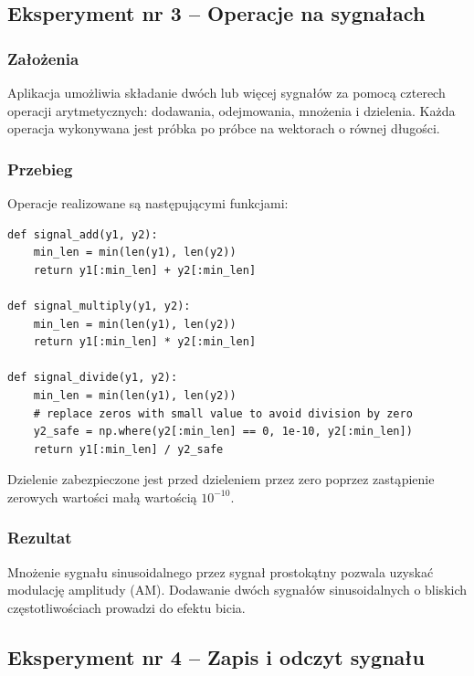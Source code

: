 \documentclass[12pt]{article}
\begin{document}
\newpage
\subsection{Eksperyment nr 3 -- Operacje na sygnałach}

\subsubsection{Założenia}

Aplikacja umożliwia składanie dwóch lub więcej sygnałów
za pomocą czterech operacji arytmetycznych: dodawania, odejmowania,
mnożenia i dzielenia. Każda operacja wykonywana jest próbka po próbce
na wektorach o równej długości.

\subsubsection{Przebieg}

Operacje realizowane są następującymi funkcjami:

\begin{lstlisting}
def signal_add(y1, y2):
    min_len = min(len(y1), len(y2))
    return y1[:min_len] + y2[:min_len]

def signal_multiply(y1, y2):
    min_len = min(len(y1), len(y2))
    return y1[:min_len] * y2[:min_len]

def signal_divide(y1, y2):
    min_len = min(len(y1), len(y2))
    # replace zeros with small value to avoid division by zero
    y2_safe = np.where(y2[:min_len] == 0, 1e-10, y2[:min_len])
    return y1[:min_len] / y2_safe
\end{lstlisting}

Dzielenie zabezpieczone jest przed dzieleniem przez zero poprzez
zastąpienie zerowych wartości małą wartością $10^{-10}$.

\subsubsection{Rezultat}

Mnożenie sygnału sinusoidalnego przez sygnał prostokątny
pozwala uzyskać modulację amplitudy (AM). Dodawanie dwóch
sygnałów sinusoidalnych o bliskich częstotliwościach
prowadzi do efektu bicia.

\subsection{Eksperyment nr 4 -- Zapis i odczyt sygnału}
\end{document}
